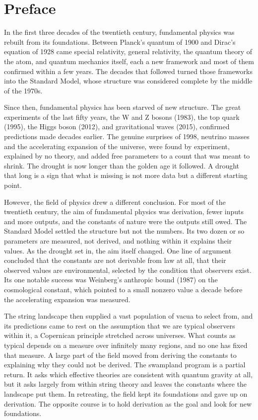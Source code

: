 \section*{Preface}\label{front:preface}
In the first three decades of the twentieth century, fundamental physics was rebuilt from its foundations. Between Planck's quantum of 1900 and Dirac's equation of 1928 came special relativity, general relativity, the quantum theory of the atom, and quantum mechanics itself, each a new framework and most of them confirmed within a few years. The decades that followed turned those frameworks into the Standard Model, whose structure was considered complete by the middle of the 1970s.

Since then, fundamental physics has been starved of new structure. The great experiments of the last fifty years, the W and Z bosons (1983), the top quark (1995), the Higgs boson (2012), and gravitational waves (2015), confirmed predictions made decades earlier. The genuine surprises of 1998, neutrino masses and the accelerating expansion of the universe, were found by experiment, explained by no theory, and added free parameters to a count that was meant to shrink. The drought is now longer than the golden age it followed. A drought that long is a sign that what is missing is not more data but a different starting point.

However, the field of physics drew a different conclusion. For most of the twentieth century, the aim of fundamental physics was derivation, fewer inputs and more outputs, and the constants of nature were the outputs still owed. The Standard Model settled the structure but not the numbers. Its two dozen or so parameters are measured, not derived, and nothing within it explains their values. As the drought set in, the aim itself changed. One line of argument concluded that the constants are not derivable from law at all, that their observed values are environmental, selected by the condition that observers exist. Its one notable success was Weinberg's anthropic bound (1987) on the cosmological constant, which pointed to a small nonzero value a decade before the accelerating expansion was measured.

The string landscape then supplied a vast population of vacua to select from, and its predictions came to rest on the assumption that we are typical observers within it, a Copernican principle stretched across universes. What counts as typical depends on a measure over infinitely many regions, and no one has fixed that measure. A large part of the field moved from deriving the constants to explaining why they could not be derived. The swampland program is a partial return. It asks which effective theories are consistent with quantum gravity at all, but it asks largely from within string theory and leaves the constants where the landscape put them. In retreating, the field kept its foundations and gave up on derivation. The opposite course is to hold derivation as the goal and look for new foundations.

